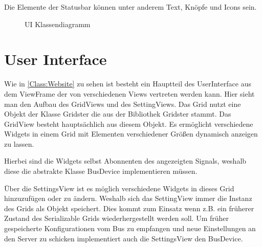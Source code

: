 \documentclass[entwurf.tex]{subfiles}
\begin{document}
		Die Elemente der Statusbar können unter anderem Text, Knöpfe und Icons sein.
		\begin{figure}[H]
  			\begin{center}
  				\caption{UI Klassendiagramm}
  			\end{center}
  		\end{figure}  	
  	
  	\newpage
  	\section{User Interface}
		Wie in \ref{Class:Website} zu sehen ist besteht ein Hauptteil des UserInterface aus dem ViewFrame der von verschiedenen Views vertreten werden kann. Hier sieht man den Aufbau des GridViews und des SettingViews. Das Grid nutzt eine Objekt der Klasse Gridster die aus der Bibliothek Gridster stammt. Das GridView besteht hauptsächlich aus diesem Objekt. Es ermöglicht verschiedene Widgets in einem Grid mit Elementen verschiedener Größen dynamisch anzeigen zu lassen.
		
		Hierbei sind die Widgets selbst Abonnenten des angezeigten Signals, weshalb diese die abstrakte Klasse BusDevice implementieren müssen.
		
		Über die SettingsView ist es möglich verschiedene Widgets in dieses Grid hinzuzufügen oder zu ändern. Weshalb sich das SettingView immer die Instanz des Grids als Objekt speichert. Dies kommt zum Einsatz wenn z.B. ein früherer Zustand des Serializable Grids wiederhergestellt werden soll. Um früher gespeicherte Konfigurationen vom Bus zu empfangen und neue Einstellungen an den Server zu schicken implementiert auch die SettingsView den BusDevice. 
		
\end{document}
